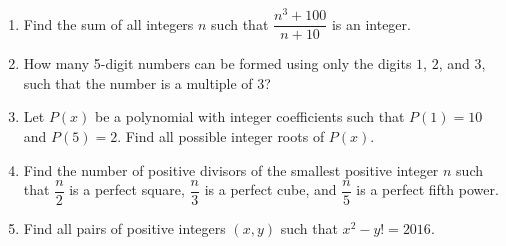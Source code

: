 \documentclass[11pt,a4paper]{article}
\begin{document}
\begin{enumerate}

\item Find the sum of all integers $n$ such that $\dfrac{n^3+100}{n+10}$ is an integer.

\item How many 5-digit numbers can be formed using only the digits $1$, $2$, and $3$, such that the number is a multiple of $3$?

\item Let $P(x)$ be a polynomial with integer coefficients such that $P(1) = 10$ and $P(5) = 2$. Find all possible integer roots of $P(x)$.

\item Find the number of positive divisors of the smallest positive integer $n$ such that $\dfrac{n}{2}$ is a perfect square, $\dfrac{n}{3}$ is a perfect cube, and $\dfrac{n}{5}$ is a perfect fifth power.

\item Find all pairs of positive integers $(x,y)$ such that $x^2 - y! = 2016$.

\end{enumerate}

\end{document}

